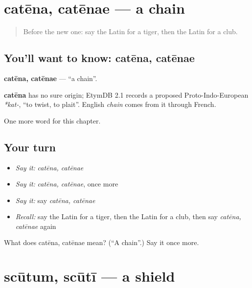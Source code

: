 \section[catēna, catēnae]{catēna, catēnae — a chain}

\label{lesson:LA-C251-catena}



\begin{quote}
Before the new one: say the Latin for a tiger, then the Latin for a club.
\end{quote}

\subsection*{You'll want to know: catēna, catēnae}
\textbf{catēna, catēnae} — \textquotedblleft{}a chain\textquotedblright{}.

\begin{cousinweb}
\textbf{catēna} has no sure origin; EtymDB 2.1 records a proposed Proto-Indo-European \emph{*kat-}, \textquotedblleft{}to twist, to plait\textquotedblright{}. English \emph{chain} comes from it through French.
\end{cousinweb}

\begin{grammarlens}[title={What you've built}]
One more word for this chapter.
\end{grammarlens}

\subsection*{Your turn}
\begin{itemize}
\raggedright
  \item \emph{Say it:} \emph{catēna, catēnae}
  \item \emph{Say it:} \emph{catēna, catēnae}, once more
  \item \emph{Say it:} say \emph{catēna, catēnae}
  \item \emph{Recall:} say the Latin for a tiger, then the Latin for a club, then say \emph{catēna, catēnae} again
\end{itemize}

\begin{tcolorbox}[breakable,colback=teal!4,colframe=teal!35!black,title={Before you move on}]
What does catēna, catēnae mean? (\textquotedblleft{}A chain\textquotedblright{}.) Say it once more.
\end{tcolorbox}
\section[scūtum, scūtī]{scūtum, scūtī — a shield}

